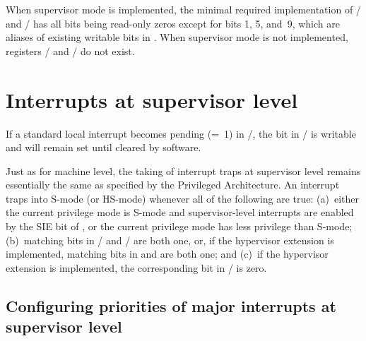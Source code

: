 When supervisor mode is implemented, the minimal required
implementation of / and / has all
bits being read-only zeros except for  bits 1, 5, and~9, which
are aliases of existing writable bits in .
When supervisor mode is not implemented, registers /
and / do not exist.


\section{Interrupts at supervisor level}
\label{sec:intrs-S}

If a standard local interrupt
becomes pending (=~1) in /, the bit in /
is writable and will remain set until cleared by software.

Just as for machine level, the taking of interrupt traps at supervisor
level remains essentially the same as specified by the {\RISCV}
Privileged Architecture.
An interrupt traps into \mbox{S-mode} (or \mbox{HS-mode}) whenever all
of the following are true:
(a)~either the current privilege mode is \mbox{S-mode} and
supervisor-level interrupts are enabled by the SIE bit of ,
or the current privilege mode has less privilege than \mbox{S-mode};
(b)~matching bits in / and / are both
one, or, if the hypervisor extension is implemented, matching bits in
 and  are both one; and
(c)~if the hypervisor extension is implemented, the corresponding bit
in / is zero.

\subsection{Configuring priorities of major interrupts at supervisor level}
\label{sec:intrPrios-S}

